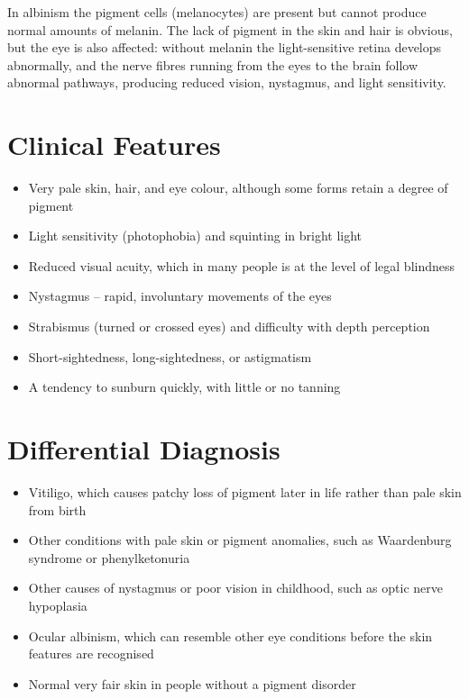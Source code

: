 In albinism the pigment cells (melanocytes) are present but cannot produce normal amounts of melanin. The lack of pigment in the skin and hair is obvious, but the eye is also affected: without melanin the light-sensitive retina develops abnormally, and the nerve fibres running from the eyes to the brain follow abnormal pathways, producing reduced vision, nystagmus, and light sensitivity.

\section*{Clinical Features}
\begin{itemize}
    \item Very pale skin, hair, and eye colour, although some forms retain a degree of pigment
    \item Light sensitivity (photophobia) and squinting in bright light
    \item Reduced visual acuity, which in many people is at the level of legal blindness
    \item Nystagmus -- rapid, involuntary movements of the eyes
    \item Strabismus (turned or crossed eyes) and difficulty with depth perception
    \item Short-sightedness, long-sightedness, or astigmatism
    \item A tendency to sunburn quickly, with little or no tanning
\end{itemize}

\section*{Differential Diagnosis}
\begin{itemize}
    \item Vitiligo, which causes patchy loss of pigment later in life rather than pale skin from birth
    \item Other conditions with pale skin or pigment anomalies, such as Waardenburg syndrome or phenylketonuria
    \item Other causes of nystagmus or poor vision in childhood, such as optic nerve hypoplasia
    \item Ocular albinism, which can resemble other eye conditions before the skin features are recognised
    \item Normal very fair skin in people without a pigment disorder
\end{itemize}

